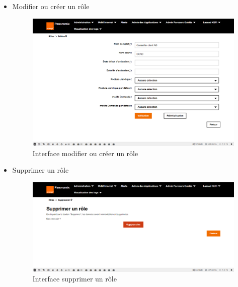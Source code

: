 \begin{itemize}
	\item Modifier ou créer un rôle
	\begin{figure}[H]
		\centering
		\includegraphics[width=0.7\linewidth]{img/screenshots/roles/edit}
		\caption[Interface modifier ou créer un rôle]{Interface modifier ou créer un rôle}
		\label{fig:modif-role}
	\end{figure}

	\item Supprimer un rôle
	\begin{figure}[H]
		\centering
		\includegraphics[width=0.7\linewidth]{img/screenshots/roles/delete}
		\caption[Interface sSupprimer un rôle]{Interface supprimer un rôle}
		\label{fig:delete-role}
	\end{figure}
\end{itemize}

